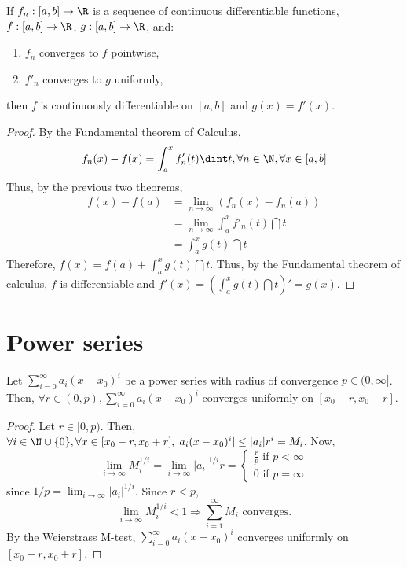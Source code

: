 \begin{theorem}
    If $f_n: [a,b] \to \R$ is a sequence of continuous differentiable functions, $f: [a,b] \to \R$, $g:[a,b] \to \R$, and:
    \begin{enumerate}
        \item $f_n$ converges to $f$ pointwise,
        \item $f'_n$ converges to $g$ uniformly,
    \end{enumerate}
    then $f$ is continuously differentiable on $[a,b]$ and $g(x) = f'(x)$.
\end{theorem}

\begin{proof}
    By the Fundamental theorem of Calculus,
    \begin{equation*}
        f_n(x) - f(x) = \int_a^x f'_n(t)\dint t, \forall n \in \N, \forall x \in [a,b]
    \end{equation*}
    Thus, by the previous two theorems,
    \begin{align*}
        f(x) - f(a) &= \lim \limits_{n \to \infty} (f_n(x) - f_n(a)) \\
        &= \lim \limits_{n \to \infty} \int_a^x f'_n(t) \dint t \\
        &= \int_a^x g(t) \dint t
    \end{align*}
    Therefore, $f(x) = f(a) + \int_a^x g(t) \dint t$. Thus, by the Fundamental theorem of calculus, $f$ is differentiable and $f'(x) = (\int_a^x g(t) \dint t)' = g(x)$.
\end{proof}

\section{Power series}

\begin{theorem}
    Let $\sum_{i=0}^\infty a_i(x - x_0)^i$ be a power series with radius of convergence $p \in (0, \infty]$. Then,  $\forall r \in (0, p), \sum_{i=0}^\infty a_i(x - x_0)^i$ converges uniformly on $[x_0 - r, x_0 + r]$.
\end{theorem}

\begin{proof}
    Let $r \in [0, p)$. Then, $\forall i \in \N \cup \{0\}, \forall x \in [x_0 - r, x_0 + r], |a_i(x-x_0)^i| \leq |a_i|r^i = M_i$. Now,
    \begin{equation*}
        \lim \limits_{i \to \infty} M_i^{1/i} = \lim \limits_{i \to \infty} |a_i|^{1/i} r = \begin{cases}
            \frac{r}{p} \text{ if } p < \infty \\
            0 \text{ if } p = \infty
        \end{cases}
    \end{equation*}
    since $1/p = \lim_{i \to \infty} |a_i|^{1/i}$. Since $r < p$,
    \begin{equation*}
        \lim \limits_{i \to \infty} M_i^{1/i} < 1 \Longrightarrow \sum \limits_{i=1}^\infty M_i \text{ converges.}
    \end{equation*}
    By the Weierstrass M-test, $\sum_{i=0}^\infty a_i(x-x_0)^i$ converges uniformly on $[x_0 - r, x_0 + r]$.
\end{proof}

